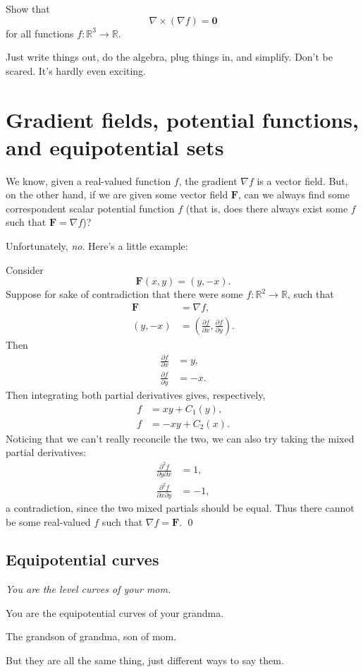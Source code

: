 \documentclass[11pt]{article}
\renewcommand{\vec}[1]{\bm{#1}}
\newcommand{\real}{\mathbb R}
\begin{document}
Show that
\[
    \nabla \times (\nabla f) = \vec 0
\]
for all functions \(f \colon \real^3 \to \real\).

Just write things out, do the algebra, plug things in, and simplify. Don't be scared. It's hardly even exciting.

\section*{Gradient fields, potential functions, and equipotential sets}

We know, given a real-valued function \(f\), the gradient \(\nabla f\) is a vector field. But, on the other hand, if we are given some vector field \(\vec F\), can we always find some correspondent scalar potential function \(f\) (that is, does there always exist some \(f\) such that \(\vec F = \nabla f\))?

Unfortunately, \emph{no}. Here's a little example:

Consider
\[
    \vec F(x, y) = (y, - x).
\]
Suppose for sake of contradiction that there were some \(f \colon \real^2 \to \real\), such that
\begin{align*}
    \vec F &= \nabla f, \\
    (y, -x) &= \left(\frac{\partial f}{\partial x}, \frac{\partial f}{\partial y}\right).
\end{align*}
Then
\begin{align*}
    \frac{\partial f}{\partial x} &= y, \\
    \frac{\partial f}{\partial y} &= -x.
\end{align*}
Then integrating both partial derivatives gives, respectively,
\begin{align*}
    f &= xy + C_1(y), \\
    f &= -xy + C_2(x).
\end{align*}
Noticing that we can't really reconcile the two, we can also try taking the mixed partial derivatives:
\begin{align*}
    \frac{\partial^2 f}{\partial y \partial x} &= 1, \\
    \frac{\partial^2 f}{\partial x \partial y} &= -1,
\end{align*}
a contradiction, since the two mixed partials should be equal. Thus there cannot be some real-valued \(f\) such that \(\nabla f = \vec F\).
\qed

\subsection*{Equipotential curves}

\begin{framed}
    \itshape
    You are the level curves of your mom.
    
    You are the equipotential curves of your grandma.
    
    The grandson of grandma, son of mom. 
    
    But they are all the same thing, just different ways to say them.
\end{framed}
\end{document}
